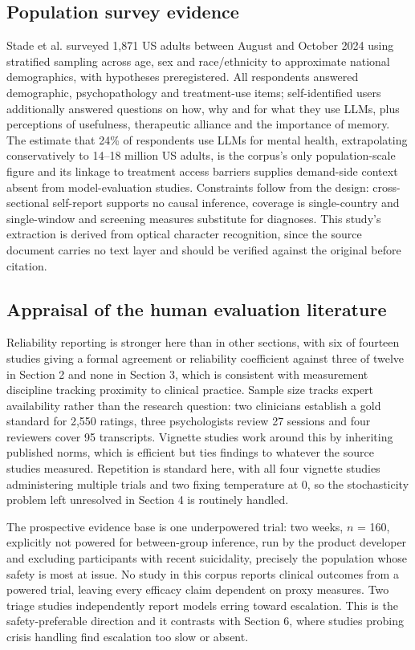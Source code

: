 \documentclass[11pt]{article}
\begin{document}
	\subsection{Population survey evidence}
	
	Stade et al.\cite{Stade2026} surveyed 1,871 US adults between August and October 2024 using stratified sampling across age, sex and race/ethnicity to approximate national demographics, with hypotheses preregistered. All respondents answered demographic, psychopathology and treatment-use items; self-identified users additionally answered questions on how, why and for what they use LLMs, plus perceptions of usefulness, therapeutic alliance and the importance of memory. The estimate that 24\% of respondents use LLMs for mental health, extrapolating conservatively to 14--18 million US adults, is the corpus's only population-scale figure and its linkage to treatment access barriers supplies demand-side context absent from model-evaluation studies. Constraints follow from the design: cross-sectional self-report supports no causal inference, coverage is single-country and single-window and screening measures substitute for diagnoses. This study's extraction is derived from optical character recognition, since the source document carries no text layer and should be verified against the original before citation.
	
	\subsection{Appraisal of the human evaluation literature}
	
	Reliability reporting is stronger here than in other sections, with six of fourteen studies giving a formal agreement or reliability coefficient against three of twelve in Section 2 and none in Section 3, which is consistent with measurement discipline tracking proximity to clinical practice. Sample size tracks expert availability rather than the research question: two clinicians establish a gold standard for 2,550 ratings, three psychologists review 27 sessions and four reviewers cover 95 transcripts. Vignette studies work around this by inheriting published norms, which is efficient but ties findings to whatever the source studies measured. Repetition is standard here, with all four vignette studies administering multiple trials and two fixing temperature at 0, so the stochasticity problem left unresolved in Section 4 is routinely handled.
	
	The prospective evidence base is one underpowered trial: two weeks, $n$ = 160, explicitly not powered for between-group inference, run by the product developer and excluding participants with recent suicidality, precisely the population whose safety is most at issue. No study in this corpus reports clinical outcomes from a powered trial, leaving every efficacy claim dependent on proxy measures. Two triage studies independently report models erring toward escalation. This is the safety-preferable direction and it contrasts with Section 6, where studies probing crisis handling find escalation too slow or absent.
	
\end{document}
